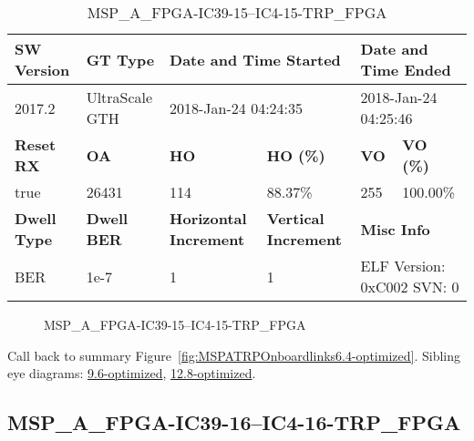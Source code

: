 \begin{table}[h]
\centering
\caption{MSP\_A\_FPGA-IC39-15--IC4-15-TRP\_FPGA}
\label{tab:MSPAFPGAIC3915IC415TRPFPGA6.4-optimized}
\begin{tabular}{@{}|l|l|l|l|l|l|@{}}
\toprule
\textbf{SW Version}                & \textbf{GT Type}   & \multicolumn{2}{l|}{\textbf{Date and Time Started}}            & \multicolumn{2}{l|}{\textbf{Date and Time Ended}}        \\ \midrule
2017.2                       & UltraScale GTH          & \multicolumn{2}{l|}{2018-Jan-24 04:24:35}                   & \multicolumn{2}{l|}{2018-Jan-24 04:25:46}               \\ \midrule
\textbf{Reset RX}                  & \textbf{OA} & \textbf{HO}   & \textbf{HO (\%)} & \textbf{VO} & \textbf{VO (\%)} \\ \midrule
true & 26431        & 114          & 88.37\%        & 255        & 100.00\%       \\ \midrule
\textbf{Dwell Type}                & \textbf{Dwell BER} & \textbf{Horizontal Increment} & \textbf{Vertical Increment}    & \multicolumn{2}{l|}{\textbf{Misc Info}}                  \\ \midrule
BER                            & 1e-7        & 1        & 1           & \multicolumn{2}{l|}{ELF Version: 0xC002 SVN: 0}                         \\ \bottomrule
\end{tabular}
\end{table}

\begin{figure}[h]
\caption{MSP\_A\_FPGA-IC39-15--IC4-15-TRP\_FPGA} \label{fig:MSPAFPGAIC3915IC415TRPFPGA6.4-optimized}
\end{figure}

Call back to summary Figure~\ref{fig:MSPATRPOnboardlinks6.4-optimized}.
Sibling eye diagrams: \hyperref[sec:MSPAFPGAIC3915IC415TRPFPGA9.6-optimized]{9.6-optimized}, \hyperref[sec:MSPAFPGAIC3915IC415TRPFPGA12.8-optimized]{12.8-optimized}.

\clearpage
\newpage


\subsection{MSP\_A\_FPGA-IC39-16--IC4-16-TRP\_FPGA}\label{sec:MSPAFPGAIC3916IC416TRPFPGA6.4-optimized}

